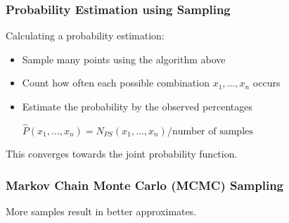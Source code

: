 \documentclass[
../../EiKI_Summary.tex,
]
{subfiles}
\begin{document}
\subsubsection*{Probability Estimation using Sampling}
Calculating a probability estimation:
\begin{itemize}
    \item Sample many points using the algorithm above
    \item Count how often each possible combination $x_1, \ldots, x_n$ occurs
    \item Estimate the probability by the observed percentages \\
    \begin{smallmathbox*}
        $\hat{P}(x_1, \ldots, x_n) = N_{PS}(x_1, \ldots, x_n) / \text{number of samples}$
    \end{smallmathbox*}
\end{itemize}

This converges towards the joint probability function.

\subsubsection*{Markov Chain Monte Carlo (MCMC) Sampling}
\begin{codebox*}
    \begin{algorithm}[H]

    \end{algorithm}
\end{codebox*}

More samples result in better approximates.
\end{document}
